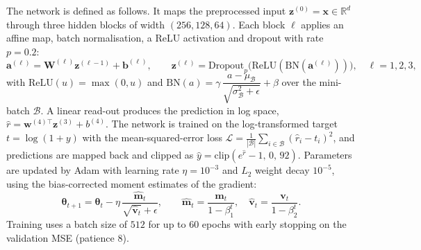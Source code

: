 \documentclass[11pt]{article}
\begin{document}
The network is defined as follows. It maps the preprocessed input $\mathbf{z}^{(0)}=\mathbf{x}\in\mathbb{R}^{d}$ through three hidden blocks of width $(256,128,64)$. Each block $\ell$ applies an affine map, batch normalisation, a ReLU activation and dropout with rate $p=0.2$:
\[ \mathbf{a}^{(\ell)}=\mathbf{W}^{(\ell)}\mathbf{z}^{(\ell-1)}+\mathbf{b}^{(\ell)},\qquad \mathbf{z}^{(\ell)}=\mathrm{Dropout}_{p}\!\big(\mathrm{ReLU}(\mathrm{BN}(\mathbf{a}^{(\ell)}))\big),\quad \ell=1,2,3, \]
with $\mathrm{ReLU}(u)=\max(0,u)$ and $\mathrm{BN}(a)=\gamma\,\dfrac{a-\mu_{\mathcal{B}}}{\sqrt{\sigma_{\mathcal{B}}^{2}+\epsilon}}+\beta$ over the mini-batch $\mathcal{B}$. A linear read-out produces the prediction in log space, $\hat r=\mathbf{w}^{(4)\top}\mathbf{z}^{(3)}+b^{(4)}$. The network is trained on the log-transformed target $t=\log(1+y)$ with the mean-squared-error loss $\mathcal{L}=\frac{1}{|\mathcal{B}|}\sum_{i\in\mathcal{B}}(\hat r_i-t_i)^{2}$, and predictions are mapped back and clipped as $\hat y=\mathrm{clip}(e^{\hat r}-1,\,0,\,92)$. Parameters are updated by Adam with learning rate $\eta=10^{-3}$ and $L_2$ weight decay $10^{-5}$, using the bias-corrected moment estimates of the gradient:
\[ \boldsymbol{\theta}_{t+1}=\boldsymbol{\theta}_{t}-\eta\,\frac{\hat{\mathbf{m}}_t}{\sqrt{\hat{\mathbf{v}}_t}+\epsilon},\qquad \hat{\mathbf{m}}_t=\frac{\mathbf{m}_t}{1-\beta_1^{t}},\quad \hat{\mathbf{v}}_t=\frac{\mathbf{v}_t}{1-\beta_2^{t}}. \]
Training uses a batch size of $512$ for up to $60$ epochs with early stopping on the validation MSE (patience $8$).
\end{document}
